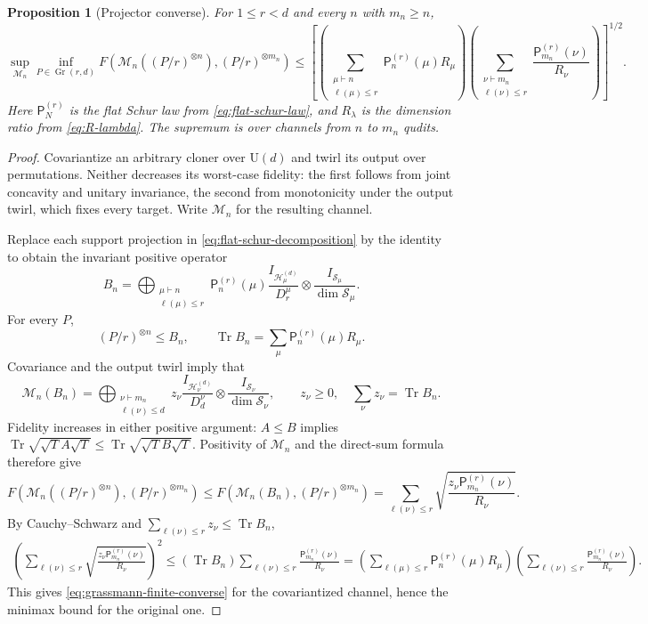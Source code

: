 \documentclass[11pt]{article}
\newtheorem{proposition}[proposition]{Proposition}
\theoremstyle{remark}
\theoremstyle{plain}
\newcommand{\cH}{\mathcal H}
\newcommand{\cM}{\mathcal M}
\newcommand{\cS}{\mathcal S}
\newcommand{\U}{\mathrm U}
\newcommand{\Gr}{\operatorname{Gr}}
\newcommand{\Tr}{\operatorname{Tr}}
\newcommand{\ot}{\otimes}
\begin{document}
\begin{proposition}[Projector converse]
\label{prop:grassmann-finite-converse}
For \(1\le r<d\) and every \(n\) with \(m_n\ge n\),
\begin{equation}\label{eq:grassmann-finite-converse}
 \sup_{\cM_n}\inf_{P\in\Gr(r,d)}
 F\!\left(
   \cM_n((P/r)^{\ot n}),
   (P/r)^{\ot m_n}
 \right)
 \le\left[
   \left(\sum_{\substack{\mu\vdash n\\\ell(\mu)\le r}}
     \mathsf P_n^{(r)}(\mu)R_\mu\right)
   \left(\sum_{\substack{\nu\vdash m_n\\\ell(\nu)\le r}}
     \frac{\mathsf P_{m_n}^{(r)}(\nu)}{R_\nu}\right)
 \right]^{1/2}.
\end{equation}
Here \(\mathsf P_N^{(r)}\) is the flat Schur law from
\eqref{eq:flat-schur-law}, and \(R_\lambda\) is the dimension ratio from
\eqref{eq:R-lambda}.  The supremum is over channels from \(n\) to
\(m_n\) qudits.
\end{proposition}

\begin{proof}
Covariantize an arbitrary cloner over \(\U(d)\) and twirl its output over
permutations.  Neither decreases its worst-case fidelity: the first follows
from joint concavity and unitary invariance, the second from monotonicity
under the output twirl, which fixes every target.  Write \(\cM_n\) for the
resulting channel.

Replace each support projection in \eqref{eq:flat-schur-decomposition}
by the identity to obtain the invariant positive operator
\[
  B_n=\bigoplus_{\substack{\mu\vdash n\\\ell(\mu)\le r}}
   \mathsf P_n^{(r)}(\mu)
   \frac{I_{\cH_\mu^{(d)}}}{D_r^\mu}
   \ot\frac{I_{\cS_\mu}}{\dim\cS_\mu}.
\]
For every \(P\),
\[
  (P/r)^{\ot n}\le B_n,
  \qquad
  \Tr B_n=\sum_\mu\mathsf P_n^{(r)}(\mu)R_\mu.
\]
Covariance and the output twirl imply that
\[
  \cM_n(B_n)=\bigoplus_{\substack{\nu\vdash m_n\\\ell(\nu)\le d}}
   z_\nu\frac{I_{\cH_\nu^{(d)}}}{D_d^\nu}
   \ot\frac{I_{\cS_\nu}}{\dim\cS_\nu},
  \qquad z_\nu\ge0,\quad \sum_\nu z_\nu=\Tr B_n.
\]
Fidelity increases in either positive argument:
\(A\le B\) implies
\(\Tr\sqrt{\sqrt T A\sqrt T}\le\Tr\sqrt{\sqrt T B\sqrt T}\).
Positivity of \(\cM_n\) and the direct-sum formula therefore give
\[
 F\!\left(\cM_n((P/r)^{\ot n}),(P/r)^{\ot m_n}\right)
 \le F\!\left(\cM_n(B_n),(P/r)^{\ot m_n}\right)
 =\sum_{\ell(\nu)\le r}
   \sqrt{\frac{z_\nu\mathsf P_{m_n}^{(r)}(\nu)}{R_\nu}}.
\]
By Cauchy--Schwarz and \(\sum_{\ell(\nu)\le r}z_\nu\le\Tr B_n\),
\[
\begin{aligned}
 \left(\sum_{\ell(\nu)\le r}
   \sqrt{\frac{z_\nu\mathsf P_{m_n}^{(r)}(\nu)}{R_\nu}}\right)^2
 \le (\Tr B_n)
   \sum_{\ell(\nu)\le r}\frac{\mathsf P_{m_n}^{(r)}(\nu)}{R_\nu}=\left(\sum_{\ell(\mu)\le r}\mathsf P_n^{(r)}(\mu)R_\mu\right)
   \left(\sum_{\ell(\nu)\le r}
     \frac{\mathsf P_{m_n}^{(r)}(\nu)}{R_\nu}\right).
\end{aligned}
\]
This gives \eqref{eq:grassmann-finite-converse} for the
covariantized channel, hence the minimax bound for the original one.
\end{proof}
\end{document}

